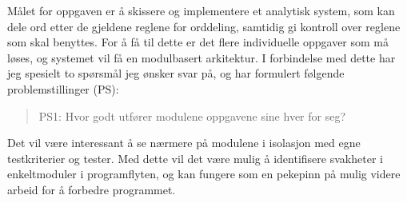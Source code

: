 


\clearpage

Målet for oppgaven er å skissere og implementere et analytisk system, som kan dele ord etter de gjeldene reglene for orddeling, samtidig gi kontroll over reglene som skal benyttes. For å få til dette er det flere individuelle oppgaver som må løses, og systemet vil få en modulbasert arkitektur. I forbindelse med dette har jeg spesielt to spørsmål jeg ønsker svar på, og har formulert følgende problemstillinger (PS):

\begin{quote}
PS1: Hvor godt utfører modulene oppgavene sine hver for seg?
\end{quote}

Det vil være interessant å se nærmere på modulene i isolasjon med egne testkriterier og tester. Med dette vil det være mulig å identifisere svakheter i enkeltmoduler i programflyten, og kan fungere som en pekepinn på mulig videre arbeid for å forbedre programmet.

